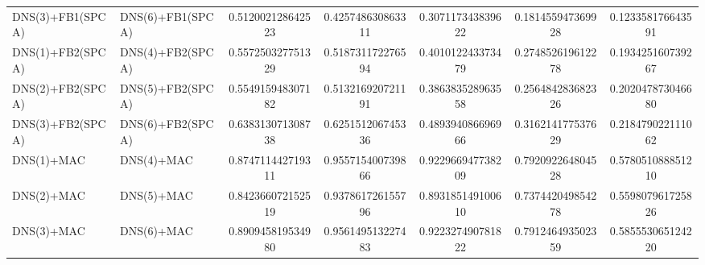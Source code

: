 \begin{table}[H]
\begin{tabular}{llSSSSS}
DNS(3)+FB1(SPCA) & DNS(6)+FB1(SPCA) & 0.512002128642523 & 0.425748630863311 & 0.307117343839622 & 0.181455947369928 & 0.123358176643591 \\ 
DNS(1)+FB2(SPCA) & DNS(4)+FB2(SPCA) & 0.557250327751329 & 0.518731172276594 & 0.401012243373479 & 0.274852619612278 & 0.193425160739267 \\ 
DNS(2)+FB2(SPCA) & DNS(5)+FB2(SPCA) & 0.554915948307182 & 0.513216920721191 & 0.386383528963558 & 0.256484283682326 & 0.202047873046680 \\ 
DNS(3)+FB2(SPCA) & DNS(6)+FB2(SPCA) & 0.638313071308738 & 0.625151206745336 & 0.489394086696966 & 0.316214177537629 & 0.218479022111062 \\ 
DNS(1)+MAC & DNS(4)+MAC & 0.874711442719311 & 0.955715400739866 & 0.922966947738209 & 0.792092264804528 & 0.578051088851210 \\ 
DNS(2)+MAC & DNS(5)+MAC & 0.842366072152519 & 0.937861726155796 & 0.893185149100610 & 0.737442049854278 & 0.559807961725826 \\ 
DNS(3)+MAC & DNS(6)+MAC & 0.890945819534980 & 0.956149513227483 & 0.922327490781822 & 0.791246493502359 & 0.585553065124220 \\ \bottomrule 
\end{tabular}
\end{table}


